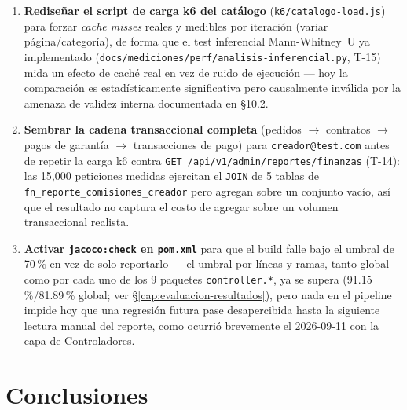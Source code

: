 \begin{enumerate}
  \item \textbf{Rediseñar el script de carga k6 del catálogo}
    (\texttt{k6/catalogo-load.js}) para forzar \emph{cache misses} reales
    y medibles por iteración (variar página/categoría), de forma que el
    test inferencial Mann-Whitney~U ya implementado
    (\texttt{docs/mediciones/perf/analisis-inferencial.py}, T-15) mida un
    efecto de caché real en vez de ruido de ejecución --- hoy la
    comparación es estadísticamente significativa pero causalmente
    inválida por la amenaza de validez interna documentada en \S10.2.
  \item \textbf{Sembrar la cadena transaccional completa} (pedidos $\to$
    contratos $\to$ pagos de garantía $\to$ transacciones de pago) para
    \texttt{creador@test.com} antes de repetir la carga k6 contra
    \texttt{GET /api/v1/admin/reportes/finanzas} (T-14): las 15{,}000
    peticiones medidas ejercitan el \texttt{JOIN} de 5 tablas de
    \texttt{fn\_reporte\_comisiones\_creador} pero agregan sobre un
    conjunto vacío, así que el resultado no captura el costo de agregar
    sobre un volumen transaccional realista.
  \item \textbf{Activar \texttt{jacoco:check} en \texttt{pom.xml}} para
    que el build falle bajo el umbral de 70\,\% en vez de solo
    reportarlo --- el umbral por líneas y ramas, tanto global como por
    cada uno de los 9 paquetes \texttt{controller.*}, ya se supera
    (91.15\,\%/81.89\,\% global; ver \S\ref{cap:evaluacion-resultados}),
    pero nada en el pipeline impide hoy que una regresión futura pase
    desapercibida hasta la siguiente lectura manual del reporte, como
    ocurrió brevemente el 2026-09-11 con la capa de Controladores.
\end{enumerate}

\chapter{Conclusiones}
\label{cap:conclusiones}

